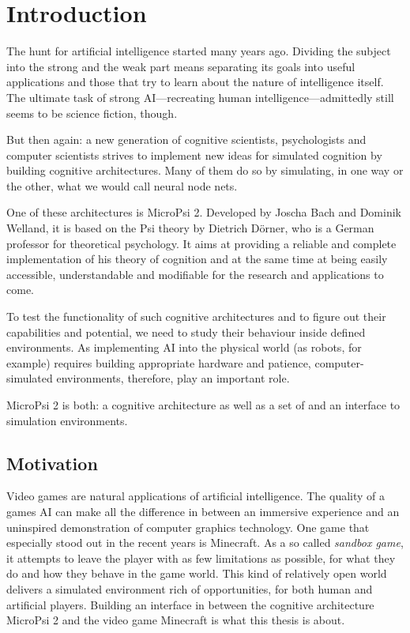\chapter{Introduction}
The hunt for artificial intelligence started many years ago. Dividing the subject into the strong and the weak part means separating its goals into useful applications and those that try to learn about the nature of intelligence itself. The ultimate task of strong AI---recreating human intelligence---admittedly still seems to be science fiction, though.

But then again: a new generation of cognitive scientists, psychologists and computer scientists strives to implement new ideas for simulated cognition by building cognitive architectures. Many of them do so by simulating, in one way or the other, what we would call neural node nets.

One of these architectures is MicroPsi 2. Developed by Joscha Bach and Dominik Welland, it is based on the Psi theory by Dietrich Dörner, who is a German professor for theoretical psychology. It aims at providing a reliable and complete implementation of his theory of cognition and at the same time at being easily accessible, understandable and modifiable for the research and applications to come.

To test the functionality of such cognitive architectures and to figure out their capabilities and potential, we need to study their behaviour inside defined environments. As implementing AI into the physical world (as robots, for example) requires building appropriate hardware and patience, computer-simulated environments, therefore, play an important role.

MicroPsi 2 is both: a cognitive architecture as well as a set of and an interface to simulation environments.

\section{Motivation}
Video games are natural applications of artificial intelligence. The quality of a games AI can make all the difference in between an immersive experience and an uninspired demonstration of computer graphics technology. One game that especially stood out in the recent years is Minecraft. As a so called \emph{sandbox game}, it attempts to leave the player with as few limitations as possible, for what they do and how they behave in the game world. This kind of relatively open world delivers a simulated environment rich of opportunities, for both human and artificial players. Building an interface in between the cognitive architecture MicroPsi 2 and the video game Minecraft is what this thesis is about.


